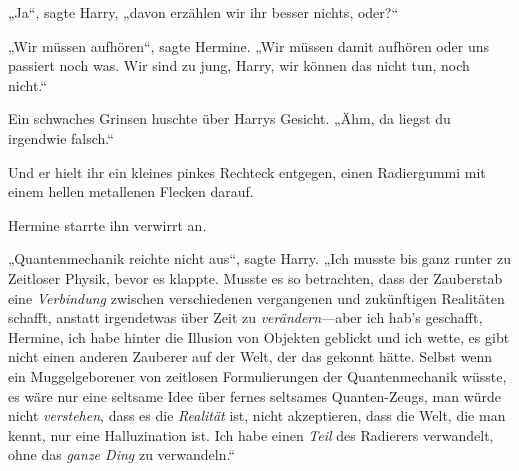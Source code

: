 „Ja“, sagte Harry, „davon erzählen wir ihr besser nichts, oder?“

„Wir müssen aufhören“, sagte Hermine. „Wir müssen damit aufhören oder uns passiert noch was. Wir sind zu jung, Harry, wir können das nicht tun, noch nicht.“

Ein schwaches Grinsen huschte über Harrys Gesicht. „Ähm, da liegst du irgendwie falsch.“

Und er hielt ihr ein kleines pinkes Rechteck entgegen, einen Radiergummi mit einem hellen metallenen Flecken darauf.

Hermine starrte ihn verwirrt an.

„Quantenmechanik reichte nicht aus“, sagte Harry. „Ich musste bis ganz runter zu Zeitloser Physik, bevor es klappte. Musste es so betrachten, dass der Zauberstab eine \emph{Verbindung} zwischen verschiedenen vergangenen und zukünftigen Realitäten schafft, anstatt irgendetwas über Zeit zu \emph{verändern}—aber ich hab’s geschafft, Hermine, ich habe hinter die Illusion von Objekten geblickt und ich wette, es gibt nicht einen anderen Zauberer auf der Welt, der das gekonnt hätte. Selbst wenn ein Muggelgeborener von zeitlosen Formulierungen der Quantenmechanik wüsste, es wäre nur eine seltsame Idee über fernes seltsames Quanten-Zeugs, man würde nicht \emph{verstehen}, dass es die \emph{Realität} ist, nicht akzeptieren, dass die Welt, die man kennt, nur eine Halluzination ist. Ich habe einen \emph{Teil} des Radierers verwandelt, ohne das \emph{ganze Ding} zu verwandeln.“

